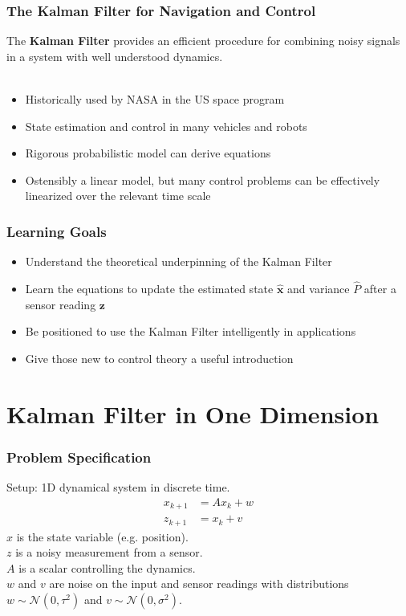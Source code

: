 \documentclass{beamer}
\renewcommand{\vec}[1]{\mathbf{#1}}
\newcommand{\vx}{\vec{x}}
\newcommand{\vz}{\vec{z}}
\newcommand{\N}{\mathcal{N}}
\newcommand{\Ph}{\hat{P}}
\newcommand{\vxh}{\hat{\vx}}
\begin{document}
\begin{frame}
\frametitle{The Kalman Filter for Navigation and Control}
The \textbf{Kalman Filter} provides an efficient procedure for combining
noisy signals in a system with well understood dynamics.\\~\\
\begin{itemize}
\item Historically used by NASA in the US space program
\item State estimation and control in many vehicles and robots
\item Rigorous probabilistic model can derive equations
\item Ostensibly a linear model, but many control problems can be effectively linearized
over the relevant time scale
\end{itemize}
\end{frame}

\begin{frame}
\frametitle{Learning Goals}
\begin{itemize}
\item Understand the theoretical underpinning of the Kalman Filter
\item Learn the equations to update the estimated state $\vxh$ and variance $\Ph$
after a sensor reading $\vz$
\item Be positioned to use the Kalman Filter intelligently in applications
\item Give those new to control theory a useful introduction
\end{itemize}
\end{frame}

\section{Kalman Filter in One Dimension}
\begin{frame}
\frametitle{Problem Specification}
Setup: 1D dynamical system in discrete time.
\begin{align*}
x_{k+1} &= A x_k + w \\
z_{k+1} &= x_k + v
\end{align*}
$x$ is the state variable (e.g. position). \\
$z$ is a noisy measurement from a sensor. \\
$A$ is a scalar controlling the dynamics. \\
$w$ and $v$ are noise on the input and sensor readings with distributions
$w \sim \N(0, \tau^2)$ and $v \sim \N(0, \sigma^2)$.
\end{frame}
\end{document}
